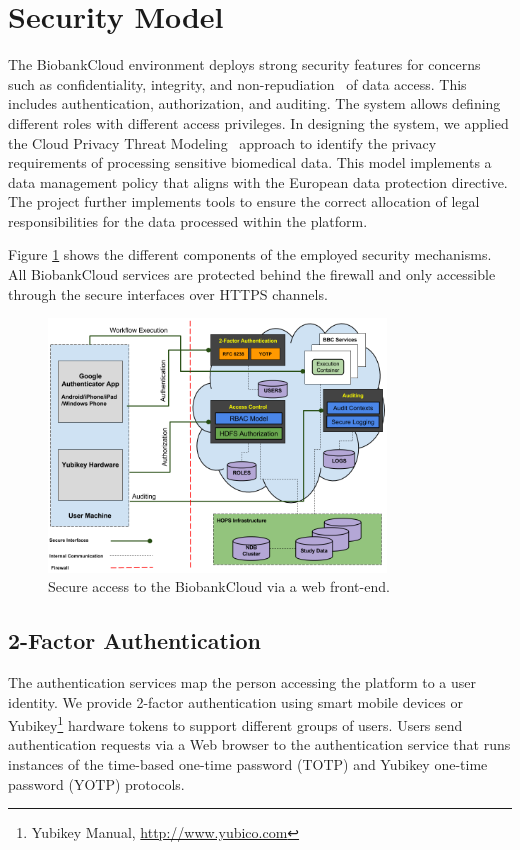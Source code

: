 \section{Security Model}

The BiobankCloud environment deploys strong security features for concerns such as confidentiality, integrity, and non-repudiation~\cite{BBCSEC} of data access. This includes authentication, authorization, and auditing. The system allows defining different roles with different access privileges. In designing the system, we applied the Cloud Privacy Threat Modeling~\cite {CPTM} approach to identify the privacy requirements of processing sensitive biomedical data. This model implements a data management policy that aligns with the European data protection directive. The project further implements tools to ensure the correct allocation of legal responsibilities for the data processed within the platform. 

Figure \ref{fig:security} shows the different components of the employed security mechanisms. All BiobankCloud services are protected behind the firewall and only accessible through the secure interfaces over HTTPS channels.

\begin{figure}[h]
\centering
\includegraphics[width=0.8\textwidth]{./imgs/security.png}
\caption{Secure access to the BiobankCloud via a web front-end.}
\label{fig:security}
\end{figure}

\subsection{2-Factor Authentication}
The authentication services map the person accessing the platform to a user identity. We provide 2-factor authentication using smart mobile devices or Yubikey\footnote{Yubikey Manual, \url{http://www.yubico.com}} hardware tokens to support different groups of users. Users send authentication requests via a Web browser to the authentication service that runs instances of the time-based one-time password (TOTP) and Yubikey one-time password (YOTP) protocols.

